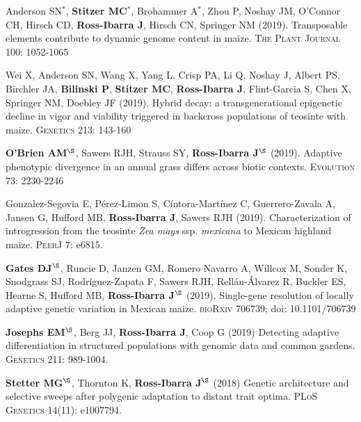 \documentclass[letterpaper,10pt]{article}
\begin{document}
\begin{etaremune}
\item  Anderson SN$^*$, \textbf{Stitzer MC}$^*$,  Brohammer A$^*$, Zhou P, Noshay JM,  O'Connor CH, Hirsch CD, \textbf{Ross-Ibarra J}, Hirsch CN, Springer NM (2019). Transposable elements contribute to dynamic genome content in maize. \textsc{The Plant Journal} 100: 1052-1065

\item Wei X,  Anderson SN,  Wang X,  Yang L, Crisp PA,  Li Q,  Noshay J, Albert PS, Birchler JA,  \textbf{Bilinski P}, \textbf{Stitzer MC}, \textbf{Ross-Ibarra J},  Flint-Garcia S,  Chen X,  Springer NM, Doebley JF (2019). Hybrid decay: a transgenerational epigenetic decline in vigor and viability triggered in backcross populations of teosinte with maize. \textsc{Genetics} 213: 143-160

\item \textbf{O'Brien AM}$^\S$, Sawers RJH, Strauss SY, \textbf{Ross-Ibarra J}$^\S$ (2019). Adaptive phenotypic divergence in an annual grass differs across biotic contexts. \textsc{Evolution} 73: 2230-2246

\item  Gonzalez-Segovia E,  P\'erez-Limon S,  C\'intora-Mart\'inez C,  Guerrero-Zavala A,  Jansen G,  Hufford MB, \textbf{Ross-Ibarra J}, Sawers RJH (2019). Characterization of introgression from the teosinte \textit{Zea mays} ssp. \textit{mexicana} to Mexican highland maize. \textsc{PeerJ} 7: e6815. %

\item \textbf{Gates DJ}$^\S$, Runcie D, Janzen GM, Romero Navarro A,  Willcox M,  Sonder K, Snodgrass SJ, Rodr\'{i}guez-Zapata F,  Sawers RJH,  Rell\'{a}n-\'{A}lvarez R, Buckler ES, Hearne S, Hufford MB, \textbf{Ross-Ibarra J}$^\S$ (2019). Single-gene resolution of locally adaptive genetic variation in Mexican maize. \textsc{bioRxiv} 706739; doi: 10.1101/706739

\item \textbf{Josephs EM}$^\S$, Berg JJ, \textbf{Ross-Ibarra J}, Coop G (2019) Detecting adaptive differentiation in structured populations with genomic data and common gardens. \textsc{Genetics} 211: 989-1004.

\item \textbf{Stetter MG}$^\S$, Thornton K, \textbf{Ross-Ibarra J}$^\S$ (2018) Genetic architecture and selective sweeps after polygenic adaptation to distant trait optima. \textsc{PLoS Genetics} 14(11): e1007794. %


\end{etaremune}
\end{document}
